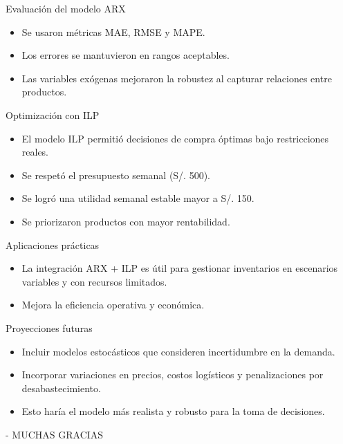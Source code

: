 \documentclass{beamer}
\begin{document}
\begin{frame}{Evaluación del modelo ARX}
\begin{itemize}
    \item Se usaron métricas MAE, RMSE y MAPE.
    \item Los errores se mantuvieron en rangos aceptables.
    \item Las variables exógenas mejoraron la robustez al capturar relaciones entre productos.
\end{itemize}
\end{frame}

\begin{frame}{Optimización con ILP}
\begin{itemize}
    \item El modelo ILP permitió decisiones de compra óptimas bajo restricciones reales.
    \item Se respetó el presupuesto semanal (S/. 500).
    \item Se logró una utilidad semanal estable mayor a S/. 150.
    \item Se priorizaron productos con mayor rentabilidad.
\end{itemize}
\end{frame}

\begin{frame}{Aplicaciones prácticas}
\begin{itemize}
    \item La integración ARX + ILP es útil para gestionar inventarios en escenarios variables y con recursos limitados.
    \item Mejora la eficiencia operativa y económica.
\end{itemize}
\end{frame}

\begin{frame}{Proyecciones futuras}
\begin{itemize}
    \item Incluir modelos estocásticos que consideren incertidumbre en la demanda.
    \item Incorporar variaciones en precios, costos logísticos y penalizaciones por desabastecimiento.
    \item Esto haría el modelo más realista y robusto para la toma de decisiones.
\end{itemize}
\end{frame}
\begin{frame}{-}
\centering
MUCHAS GRACIAS
\end{frame}
\end{document}
